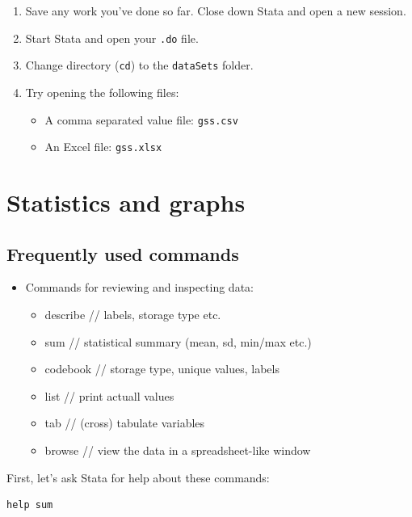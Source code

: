 \documentclass[]{book}
\providecommand{\tightlist}{%
  \setlength{\itemsep}{0pt}\setlength{\parskip}{0pt}}
\begin{document}
\begin{enumerate}
\def\labelenumi{\arabic{enumi}.}
\tightlist
\item
  Save any work you've done so far. Close down Stata and open a new
  session.
\item
  Start Stata and open your \texttt{.do} file.
\item
  Change directory (\texttt{cd}) to the \texttt{dataSets} folder.
\item
  Try opening the following files:

  \begin{itemize}
  \tightlist
  \item
    A comma separated value file: \texttt{gss.csv}
  \item
    An Excel file: \texttt{gss.xlsx}
  \end{itemize}
\end{enumerate}

\section{Statistics and graphs}\label{statistics-and-graphs}

\subsection{Frequently used commands}\label{frequently-used-commands}

\begin{itemize}
\tightlist
\item
  Commands for reviewing and inspecting data:

  \begin{itemize}
  \tightlist
  \item
    describe // labels, storage type etc.
  \item
    sum // statistical summary (mean, sd, min/max etc.)
  \item
    codebook // storage type, unique values, labels
  \item
    list // print actuall values
  \item
    tab // (cross) tabulate variables
  \item
    browse // view the data in a spreadsheet-like window
  \end{itemize}
\end{itemize}

First, let's ask Stata for help about these commands:

\begin{verbatim}
help sum
\end{verbatim}
\end{document}
